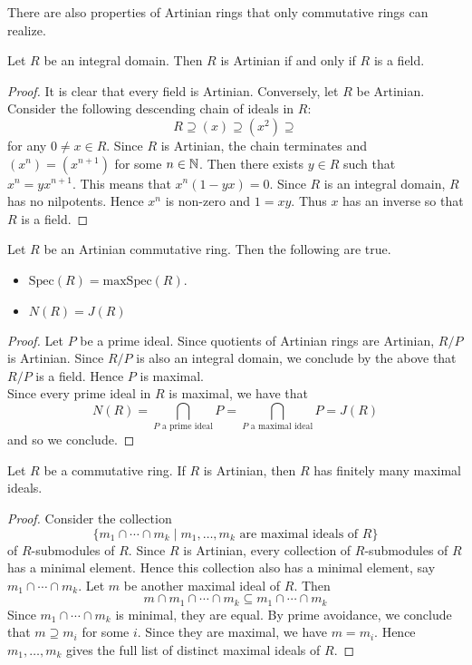 \documentclass[a4paper]{article}
\begin{document}
There are also properties of Artinian rings that only commutative rings can realize. 

\begin{prp}{}{} Let $R$ be an integral domain. Then $R$ is Artinian if and only if $R$ is a field. 
\begin{proof}
It is clear that every field is Artinian. Conversely, let $R$ be Artinian. Consider the following descending chain of ideals in $R$: $$R\supseteq(x)\supseteq(x^2)\supseteq$$ for any $0\neq x\in R$. Since $R$ is Artinian, the chain terminates and $(x^n)=(x^{n+1})$ for some $n\in\mathbb{N}$. Then there exists $y\in R$ such that $x^n=yx^{n+1}$. This means that $x^n(1-yx)=0$. Since $R$ is an integral domain, $R$ has no nilpotents. Hence $x^n$ is non-zero and $1=xy$. Thus $x$ has an inverse so that $R$ is a field. 
\end{proof}
\end{prp}

\begin{prp}{}{} Let $R$ be an Artinian commutative ring. Then the following are true. 
\begin{itemize}
\item $\text{Spec}(R)=\text{maxSpec}(R)$. 
\item $N(R)=J(R)$
\end{itemize}
\begin{proof}
Let $P$ be a prime ideal. Since quotients of Artinian rings are Artinian, $R/P$ is Artinian. Since $R/P$ is also an integral domain, we conclude by the above that $R/P$ is a field. Hence $P$ is maximal. \\

Since every prime ideal in $R$ is maximal, we have that $$N(R)=\bigcap_{P\text{ a prime ideal}}P=\bigcap_{P\text{ a maximal ideal}}P=J(R)$$ and so we conclude. 
\end{proof}
\end{prp}

\begin{prp}{}{} Let $R$ be a commutative ring. If $R$ is Artinian, then $R$ has finitely many maximal ideals. 
\begin{proof}
Consider the collection $$\{m_1\cap\cdots\cap m_k\;|\;m_1,\dots,m_k\text{ are maximal ideals of }R\}$$ of $R$-submodules of $R$. Since $R$ is Artinian, every collection of $R$-submodules of $R$ has a minimal element. Hence this collection also has a minimal element, say $m_1\cap\cdots\cap m_k$. Let $m$ be another maximal ideal of $R$. Then $$m\cap m_1\cap\cdots\cap m_k\subseteq m_1\cap\cdots\cap m_k$$ Since $m_1\cap\cdots\cap m_k$ is minimal, they are equal. By prime avoidance, we conclude that $m\supseteq m_i$ for some $i$. Since they are maximal, we have $m=m_i$. Hence $m_1,\dots,m_k$ gives the full list of distinct maximal ideals of $R$. 
\end{proof}
\end{prp}
\end{document}
